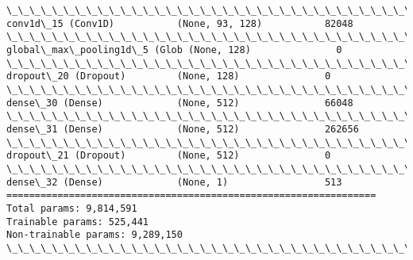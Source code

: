 \documentclass[11pt]{article}
\begin{document}
\begin{Verbatim}[commandchars=\\\{\}]
\_\_\_\_\_\_\_\_\_\_\_\_\_\_\_\_\_\_\_\_\_\_\_\_\_\_\_\_\_\_\_\_\_\_\_\_\_\_\_\_\_\_\_\_\_\_\_\_\_\_\_\_\_\_\_\_\_\_\_\_\_\_\_\_\_
conv1d\_15 (Conv1D)           (None, 93, 128)           82048
\_\_\_\_\_\_\_\_\_\_\_\_\_\_\_\_\_\_\_\_\_\_\_\_\_\_\_\_\_\_\_\_\_\_\_\_\_\_\_\_\_\_\_\_\_\_\_\_\_\_\_\_\_\_\_\_\_\_\_\_\_\_\_\_\_
global\_max\_pooling1d\_5 (Glob (None, 128)               0
\_\_\_\_\_\_\_\_\_\_\_\_\_\_\_\_\_\_\_\_\_\_\_\_\_\_\_\_\_\_\_\_\_\_\_\_\_\_\_\_\_\_\_\_\_\_\_\_\_\_\_\_\_\_\_\_\_\_\_\_\_\_\_\_\_
dropout\_20 (Dropout)         (None, 128)               0
\_\_\_\_\_\_\_\_\_\_\_\_\_\_\_\_\_\_\_\_\_\_\_\_\_\_\_\_\_\_\_\_\_\_\_\_\_\_\_\_\_\_\_\_\_\_\_\_\_\_\_\_\_\_\_\_\_\_\_\_\_\_\_\_\_
dense\_30 (Dense)             (None, 512)               66048
\_\_\_\_\_\_\_\_\_\_\_\_\_\_\_\_\_\_\_\_\_\_\_\_\_\_\_\_\_\_\_\_\_\_\_\_\_\_\_\_\_\_\_\_\_\_\_\_\_\_\_\_\_\_\_\_\_\_\_\_\_\_\_\_\_
dense\_31 (Dense)             (None, 512)               262656
\_\_\_\_\_\_\_\_\_\_\_\_\_\_\_\_\_\_\_\_\_\_\_\_\_\_\_\_\_\_\_\_\_\_\_\_\_\_\_\_\_\_\_\_\_\_\_\_\_\_\_\_\_\_\_\_\_\_\_\_\_\_\_\_\_
dropout\_21 (Dropout)         (None, 512)               0
\_\_\_\_\_\_\_\_\_\_\_\_\_\_\_\_\_\_\_\_\_\_\_\_\_\_\_\_\_\_\_\_\_\_\_\_\_\_\_\_\_\_\_\_\_\_\_\_\_\_\_\_\_\_\_\_\_\_\_\_\_\_\_\_\_
dense\_32 (Dense)             (None, 1)                 513
=================================================================
Total params: 9,814,591
Trainable params: 525,441
Non-trainable params: 9,289,150
\_\_\_\_\_\_\_\_\_\_\_\_\_\_\_\_\_\_\_\_\_\_\_\_\_\_\_\_\_\_\_\_\_\_\_\_\_\_\_\_\_\_\_\_\_\_\_\_\_\_\_\_\_\_\_\_\_\_\_\_\_\_\_\_\_
\end{Verbatim}
\end{document}
